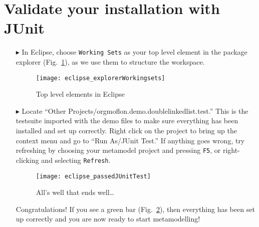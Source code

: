 \newpage
\genHeader
\hypertarget{validate common}{} 
\section{Validate your installation with JUnit}

\begin{itemize}

\item[$\blacktriangleright$] In Eclipse, choose \texttt{Working Sets} as your top level element in the package explorer (Fig.~\ref{eclipse:topLevel}), as we use
them to structure the workspace.

\begin{figure}[htbp]
	\centering
  \texttt{[image: eclipse\_explorerWorkingsets]}
	\caption{Top level elements in Eclipse}
	\label{eclipse:topLevel}
\end{figure}

\item[$\blacktriangleright$] Locate ``Other Projects/orgmoflon.demo.doublelinkedlist.test.'' This is the testsuite imported with the demo files to make sure everything has been installed and
set up correctly. Right click on the project to bring up the context menu and go to ``Run As/JUnit Test.'' If anything goes wrong, try refreshing by choosing
your metamodel project and pressing  \texttt{F5}, or right-clicking and selecting \texttt{Refresh}.

\vspace{0.5cm}

\begin{figure}[htbp]
	\centering
  \texttt{[image: eclipse\_passedJUnitTest]}
	\caption{All's well that ends well\ldots}
	\label{eclipse:passedTest}
\end{figure}

\vspace{0.5cm}

Congratulations!  If you see a green bar  (Fig.~\ref{eclipse:passedTest}), then everything has been set up correctly and you are now ready to start
metamodelling!


\end{itemize}